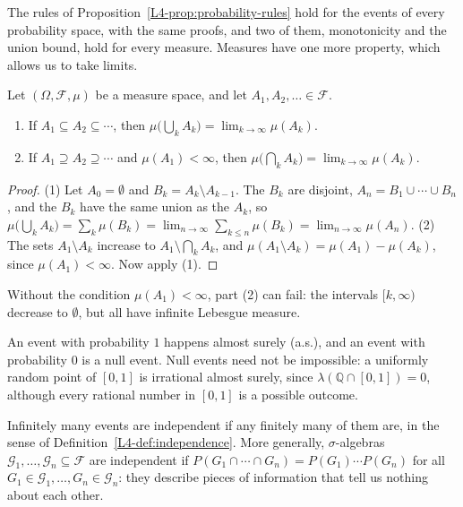 The rules of Proposition~\ref{L4-prop:probability-rules} hold for the events of every probability space, with the same proofs, and two of them, monotonicity and the union bound, hold for every measure. Measures have one more property, which allows us to take limits.

\begin{proposition}[Continuity]\label{B-prop:continuity}
    Let $(\Omega, \mathcal{F}, \mu)$ be a measure space, and let $A_1, A_2, \ldots \in \mathcal{F}$.
    \begin{enumerate}
        \item If $A_1 \subseteq A_2 \subseteq \cdots$, then $\mu\big(\bigcup_k A_k\big) = \lim_{k \to \infty} \mu(A_k)$.
        \item If $A_1 \supseteq A_2 \supseteq \cdots$ and $\mu(A_1) < \infty$, then $\mu\big(\bigcap_k A_k\big) = \lim_{k \to \infty} \mu(A_k)$.
    \end{enumerate}
\end{proposition}

\begin{proof}
    (1) Let $A_0 = \emptyset$ and $B_k = A_k \setminus A_{k-1}$. The $B_k$ are disjoint, $A_n = B_1 \cup \cdots \cup B_n$, and the $B_k$ have the same union as the $A_k$, so $\mu\big(\bigcup_k A_k\big) = \sum_k \mu(B_k) = \lim_{n \to \infty}\sum_{k \leq n} \mu(B_k) = \lim_{n \to \infty} \mu(A_n)$. (2) The sets $A_1 \setminus A_k$ increase to $A_1 \setminus \bigcap_k A_k$, and $\mu(A_1 \setminus A_k) = \mu(A_1) - \mu(A_k)$, since $\mu(A_1) < \infty$. Now apply (1).
\end{proof}

Without the condition $\mu(A_1) < \infty$, part (2) can fail: the intervals $[k, \infty)$ decrease to $\emptyset$, but all have infinite Lebesgue measure.

An event with probability $1$ happens almost surely (a.s.), and an event with probability $0$ is a null event. Null events need not be impossible: a uniformly random point of $[0, 1]$ is irrational almost surely, since $\lambda(\mathbb{Q} \cap [0, 1]) = 0$, although every rational number in $[0, 1]$ is a possible outcome.

\begin{definition}[Independence]\label{B-def:independence}
    Infinitely many events are independent if any finitely many of them are, in the sense of Definition~\ref{L4-def:independence}. More generally, $\sigma$-algebras $\mathcal{G}_1, \ldots, \mathcal{G}_n \subseteq \mathcal{F}$ are independent if $P(G_1 \cap \cdots \cap G_n) = P(G_1)\cdots P(G_n)$ for all $G_1 \in \mathcal{G}_1, \ldots, G_n \in \mathcal{G}_n$: they describe pieces of information that tell us nothing about each other.
\end{definition}

